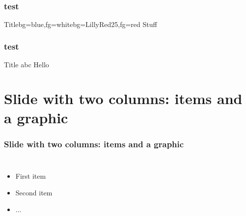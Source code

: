 \documentclass{beamer}
\begin{document}
\begin{frame}
\frametitle{test}
 

\begin{variableblock}{Title}{bg=blue,fg=white}{bg=LillyRed25,fg=red}
  Stuff
\end{variableblock}
\end{frame}


\begin{frame}
\frametitle{test}
\begin{block}{Title}
abc Hello
\end{block}
\end{frame}


\section{Slide with two columns: items and a graphic}

\begin{frame}
  \frametitle{Slide with two columns: items and a graphic}   %
  \begin{columns}[c]
  \column{2in}  %
  \begin{itemize}
  \item<1-> First item
  \item<2-> Second item
  \item<3-> ...
  \end{itemize}
  \column{2in}
  \end{columns}
\end{frame}
\end{document}
